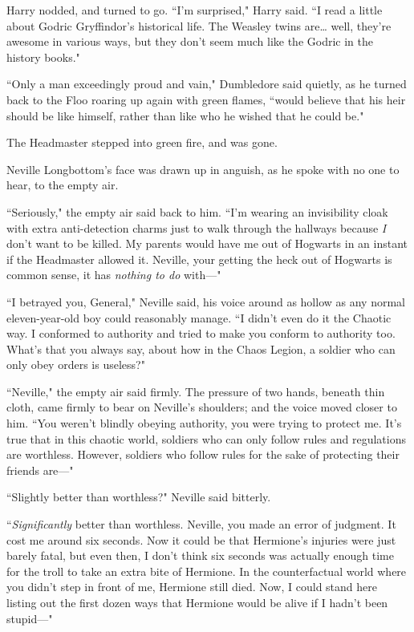 Harry nodded, and turned to go. ``I'm surprised," Harry said. ``I read a little about Godric Gryffindor's historical life. The Weasley twins are{\ldots} well, they're awesome in various ways, but they don't seem much like the Godric in the history books."

``Only a man exceedingly proud and vain," Dumbledore said quietly, as he turned back to the Floo roaring up again with green flames, ``would believe that his heir should be like himself, rather than like who he wished that he could be."

The Headmaster stepped into green fire, and was gone.


Neville Longbottom's face was drawn up in anguish, as he spoke with no one to hear, to the empty air.

``Seriously," the empty air said back to him. ``I'm wearing an invisibility cloak with extra anti-detection charms just to walk through the hallways because \emph{I} don't want to be killed. My parents would have me out of Hogwarts in an instant if the Headmaster allowed it. Neville, your getting the heck out of Hogwarts is common sense, it has \emph{nothing to do} with---"

``I betrayed you, General," Neville said, his voice around as hollow as any normal eleven-year-old boy could reasonably manage. ``I didn't even do it the Chaotic way. I conformed to authority and tried to make you conform to authority too. What's that you always say, about how in the Chaos Legion, a soldier who can only obey orders is useless?"

``Neville," the empty air said firmly. The pressure of two hands, beneath thin cloth, came firmly to bear on Neville's shoulders; and the voice moved closer to him. ``You weren't blindly obeying authority, you were trying to protect me. It's true that in this chaotic world, soldiers who can only follow rules and regulations are worthless. However, soldiers who follow rules for the sake of protecting their friends are---"

``Slightly better than worthless?" Neville said bitterly.

``\emph{Significantly} better than worthless. Neville, you made an error of judgment. It cost me around six seconds. Now it could be that Hermione's injuries were just barely fatal, but even then, I don't think six seconds was actually enough time for the troll to take an extra bite of Hermione. In the counterfactual world where you didn't step in front of me, Hermione still died. Now, I could stand here listing out the first dozen ways that Hermione would be alive if I hadn't been stupid---"

